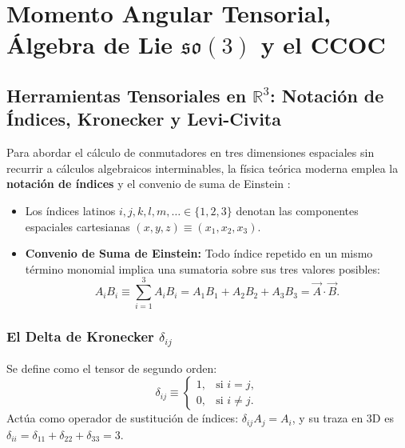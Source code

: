 
\section{Momento Angular Tensorial, Álgebra de Lie \texorpdfstring{$\mathfrak{so}(3)$}{so(3)} y el CCOC}
\label{sec:momento_angular}

\subsection{Herramientas Tensoriales en \texorpdfstring{$\mathbb{R}^3$}{R3}: Notación de Índices, Kronecker y Levi-Civita}

Para abordar el cálculo de conmutadores en tres dimensiones espaciales sin recurrir a cálculos algebraicos interminables, la física teórica moderna emplea la \textbf{notación de índices} y el convenio de suma de Einstein \cite{sakurai, zettili}:
\begin{itemize}
    \item Los índices latinos $i, j, k, l, m, \dots \in \{1, 2, 3\}$ denotan las componentes espaciales cartesianas $(x, y, z) \equiv (x_1, x_2, x_3)$.
    \item \textbf{Convenio de Suma de Einstein:} Todo índice repetido en un mismo término monomial implica una sumatoria sobre sus tres valores posibles:
    \begin{equation}
        A_i B_i \equiv \sum_{i=1}^3 A_i B_i = A_1 B_1 + A_2 B_2 + A_3 B_3 = \vec{A}\cdot\vec{B}.
    \end{equation}
\end{itemize}

\subsubsection{El Delta de Kronecker \texorpdfstring{$\delta_{ij}$}{delta\_ij}}
Se define como el tensor de segundo orden:
\begin{equation}
    \delta_{ij} \equiv \begin{cases} 1, & \text{si } i = j, \\ 0, & \text{si } i \neq j. \end{cases}
\end{equation}
Actúa como operador de sustitución de índices: $\delta_{ij} A_j = A_i$, y su traza en 3D es $\delta_{ii} = \delta_{11} + \delta_{22} + \delta_{33} = 3$.

